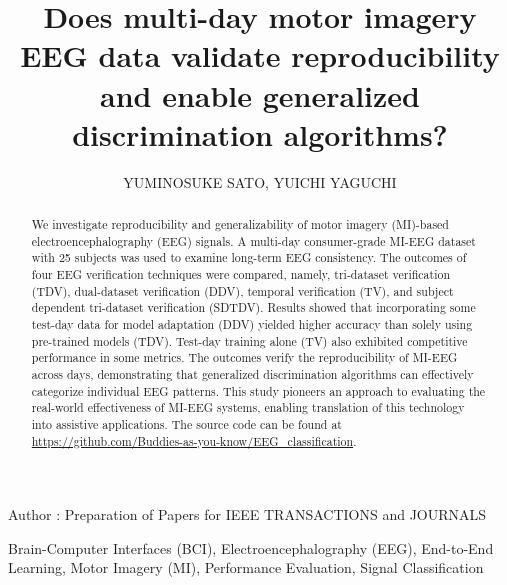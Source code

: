 \documentclass{ieeeaccess}
\begin{document}

    \title{Does multi-day motor imagery EEG data validate reproducibility and enable generalized discrimination algorithms?}
    \author{\uppercase{Yuminosuke Sato}, \uppercase{Yuichi
    Yaguchi}}

    \address[1]{University of Aizu, Fukushima Japan (e-mail: m5261158@u-aizu.ac.jp)}
    \address[2]{University of Aizu, Fukushima Japan (e-mail: yaguchi@u-aizu.ac.jp)}

    {Author \headeretal: Preparation of Papers for IEEE TRANSACTIONS and JOURNALS}


    \begin{abstract}
        We investigate reproducibility and generalizability of motor imagery (MI)-based electroencephalography (EEG) signals. A multi-day consumer-grade MI-EEG dataset with 25 subjects was used to examine long-term EEG consistency. The outcomes of four EEG verification techniques were compared, namely, tri-dataset verification (TDV), dual-dataset verification (DDV), temporal verification (TV), and subject dependent tri-dataset verification (SDTDV). Results showed that incorporating some test-day data for model adaptation (DDV) yielded higher accuracy than solely using pre-trained models (TDV). Test-day training alone (TV) also exhibited competitive performance in some metrics. The outcomes verify the reproducibility of MI-EEG across days, demonstrating that generalized discrimination algorithms can effectively categorize individual EEG patterns. This study pioneers an approach to evaluating the real-world effectiveness of MI-EEG systems, enabling translation of this technology into assistive applications. The source code can be found at \url{https://github.com/Buddies-as-you-know/EEG_classification}.
    \end{abstract}

    \begin{keywords}
        Brain-Computer Interfaces (BCI), Electroencephalography (EEG), End-to-End
        Learning, Motor Imagery (MI), Performance Evaluation, Signal Classification
    \end{keywords}

    \titlepgskip=-15pt

    \maketitle
\end{document}
